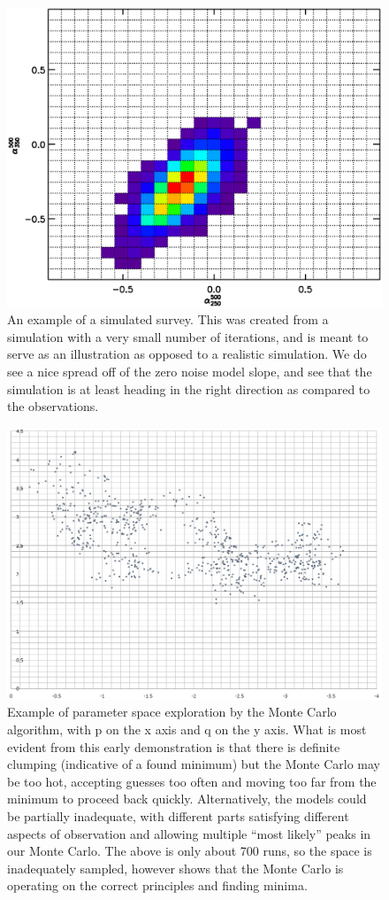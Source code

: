 \documentclass[twocolumn,letterpaper,10pt]{article}
\begin{document}
\begin{figure}
\includegraphics[width=\textwidth]{model_color_hist.eps}
\caption{An example of a simulated survey. This was created from a simulation with a very small number of iterations, and is meant to serve as an illustration as opposed to a realistic simulation. We do see a nice spread off of the zero noise model slope, and see that the simulation is at least heading in the right direction as compared to the observations.}
\label{simmed}
\end{figure}

\begin{figure}
\includegraphics[width=\textwidth]{MCTest}
\caption{Example of parameter space exploration by the Monte Carlo algorithm, with p on the x axis and q on the y axis. What is most evident from this early demonstration is that there is definite clumping (indicative of a found minimum) but the Monte Carlo may be too hot, accepting guesses too often and moving too far from the minimum to proceed back quickly. Alternatively, the models could be partially inadequate, with different parts satisfying different aspects of observation and allowing multiple ``most likely'' peaks in our Monte Carlo. The above is only about 700 runs, so the space is inadequately sampled, however shows that the Monte Carlo is operating on the correct principles and finding minima.}
\label{fig:mc}
\end{figure}
\end{document}
